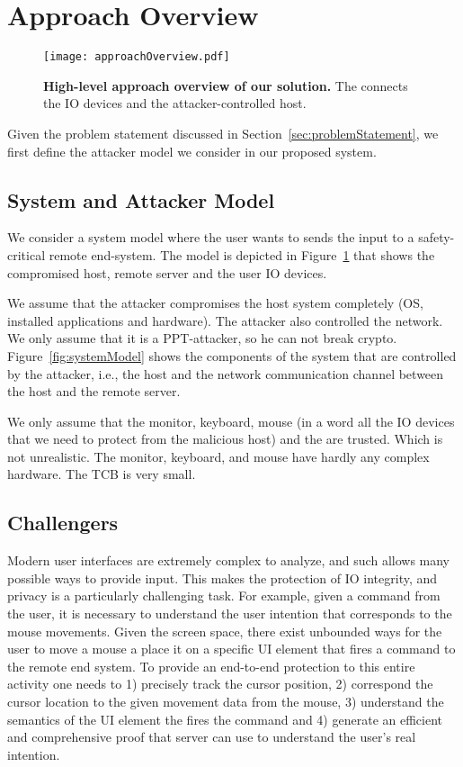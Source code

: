 \section{Approach Overview}
\label{sec:approach}





\begin{figure}[t]
\centering
\texttt{[image: approachOverview.pdf]}
\caption{\textbf{High-level approach overview of our solution.}  The \device connects the IO devices and the attacker-controlled host. }
\label{fig:approachOverview}
\centering
\end{figure}

Given the problem statement discussed in Section~\ref{sec:problemStatement}, we first define the attacker model we consider in our proposed system.


\subsection{System and Attacker Model}

We consider a system model where the user wants to sends the input to a safety-critical remote end-system. The model is depicted in Figure~\ref{fig:approachOverview} that shows the compromised host, remote server and the user IO devices. 

We assume that the attacker compromises the host system completely (OS, installed applications and hardware). The attacker also controlled the network. We only assume that it is a PPT-attacker, so he can not break crypto. Figure~\ref{fig:systemModel} shows the components of the system that are controlled by the attacker, i.e., the host and the network communication channel between the host and the remote server.

We only assume that the monitor, keyboard, mouse (in a word all the IO devices that we need to protect from the malicious host) and the \device are trusted. Which is not unrealistic. The monitor, keyboard, and mouse have hardly any complex hardware. The TCB is very small.

\subsection{Challengers}

Modern user interfaces are extremely complex to analyze, and such allows many possible ways to provide input. This makes the protection of IO integrity, and privacy is a particularly challenging task. For example, given a command from the user, it is necessary to understand the user intention that corresponds to the mouse movements. Given the screen space, there exist unbounded ways for the user to move a mouse a place it on a specific UI element that fires a command to the remote end system. To provide an end-to-end protection to this entire activity one needs to 1) precisely track the cursor position, 2) correspond the cursor location to the given movement data from the mouse, 3) understand the semantics of the UI element the fires the command and 4) generate an efficient and comprehensive proof that server can use to understand the user's real intention.  



